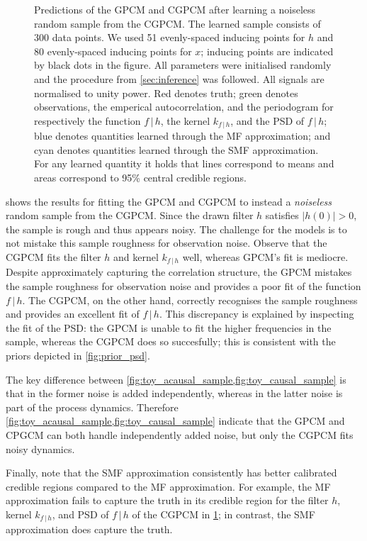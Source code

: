 \documentclass{article}
\newcommand{\cond}{\, | \,}               %
\begin{document}
\begin{figure}[t]
    \caption{Predictions of the GPCM and CGPCM after learning a noiseless random sample from the CGPCM. The learned sample consists of 300 data points. We used 51 evenly-spaced inducing points for $h$ and 80 evenly-spaced inducing points for $x$; inducing points are indicated by black dots in the figure. All parameters were initialised randomly and the procedure from \cref{sec:inference} was followed. All signals are normalised to unity power. {\color{red}Red} denotes truth; {\color{darkgreen}green} denotes observations, the emperical autocorrelation, and the periodogram for respectively the function $f\cond h$, the kernel $k_{f\cond h}$, and the PSD of $f\cond h$; {\color{blue}blue} denotes quantities learned through the MF approximation; and {\color{mycyan}cyan} denotes quantities learned through the SMF approximation. For any learned quantity it holds that lines correspond to means and areas correspond to 95\% central credible regions.}
    \label{fig:toy_causal_sample}
\end{figure}

 shows the results for fitting the GPCM and CGPCM to instead a \textit{noiseless} random sample from the CGPCM. Since the drawn filter $h$ satisfies $|h(0)|>0$, the sample is rough and thus appears noisy. The challenge for the models is to not mistake this sample roughness for observation noise. Observe that the CGPCM fits the filter $h$ and kernel $k_{f \cond h}$ well, whereas GPCM's fit is mediocre. Despite approximately capturing the correlation structure, the GPCM mistakes the sample roughness for observation noise and provides a poor fit of the function $f\cond h$. The CGPCM, on the other hand, correctly recognises the sample roughness and provides an excellent fit of $f \cond h$. This discrepancy is explained by inspecting the fit of the PSD: the GPCM is unable to fit the higher frequencies in the sample, whereas the CGPCM does so succesfully; this is consistent with the priors depicted in \cref{fig:prior_psd}.

The key difference between \cref{fig:toy_acausal_sample,fig:toy_causal_sample} is that in the former noise is added independently, whereas in the latter noise is part of the process dynamics. Therefore \cref{fig:toy_acausal_sample,fig:toy_causal_sample} indicate that the GPCM and CPGCM can both handle independently added noise, but only the CGPCM fits noisy dynamics.

Finally, note that the SMF approximation consistently has better calibrated credible regions compared to the MF approximation. For example, the MF approximation fails to capture the truth in its credible region for the filter $h$, kernel $k_{f\cond h}$, and PSD of $f \cond h$ of the CGPCM in \cref{fig:toy_causal_sample}; in contrast, the SMF approximation does capture the truth.
\end{document}
